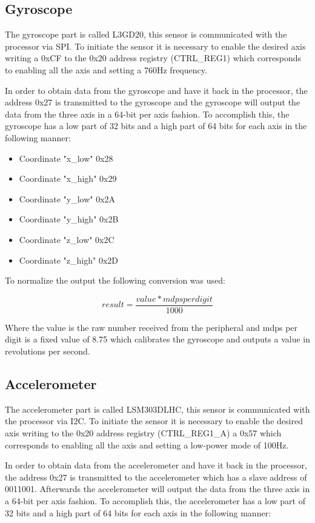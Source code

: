 \documentclass[12pt]{report}%
\begin{document}
\subsection{Gyroscope}
The gyroscope part is called L3GD20\cite{gyroscopepart}, this sensor is communicated with the processor via SPI. To initiate the sensor it is necessary to enable the desired axis writing a 0xCF to the 0x20 address registry (CTRL\_REG1) which corresponds to enabling all the axis and setting a 760Hz frequency.

In order to obtain data from the gyroscope and have it back in the processor, the address 0x27 is transmitted to the gyroscope and the gyroscope will output the data from the three axis in a 64-bit per axis fashion. To accomplish this, the gyroscope has a low part of 32 bits and a high part of 64 bits for each axis in the following manner:

\begin{itemize}
\item Coordinate "x\_low" 0x28
\item Coordinate "x\_high" 0x29
\item Coordinate "y\_low" 0x2A
\item Coordinate "y\_high" 0x2B
\item Coordinate "z\_low" 0x2C
\item Coordinate "z\_high" 0x2D
\end{itemize}
To normalize the output the following conversion was used:

\begin{equation} \label{eq:gyroscope}
	result = \frac{value * mdpsperdigit}{1000}
\end{equation}

Where the value is the raw number received from the peripheral and mdps per digit is a fixed value of 8.75 which calibrates the gyroscope and outputs a value in revolutions per second.

\subsection{Accelerometer}
The accelerometer part is called LSM303DLHC\cite{accelerometerpart}, this sensor is communicated with the processor via I2C. To initiate the sensor it is necessary to enable the desired axis writing to the 0x20 address registry (CTRL\_REG1\_A) a 0x57 which corresponds to enabling all the axis and setting  a low-power mode of 100Hz.

In order to obtain data from the accelerometer and have it back in the processor, the address 0x27 is transmitted to the accelerometer which has a slave address of 0011001. Afterwards the accelerometer will output the data from the three axis in a 64-bit per axis fashion. To accomplish this, the accelerometer has a low part of 32 bits and a high part of 64 bits for each axis in the following manner:
\end{document}
